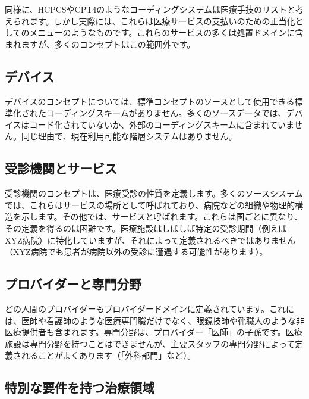 \documentclass[
  11pt]{book}
\theoremstyle{definition}
\theoremstyle{definition}
\theoremstyle{definition}
\theoremstyle{definition}
\theoremstyle{remark}
\begin{document}
同様に、HCPCSやCPT4のようなコーディングシステムは医療手技のリストと考えられます。しかし実際には、これらは医療サービスの支払いのための正当化としてのメニューのようなものです。これらのサービスの多くは処置ドメインに含まれますが、多くのコンセプトはこの範囲外です。

\subsection{デバイス}\label{ux30c7ux30d0ux30a4ux30b9}

デバイスのコンセプトについては、標準コンセプトのソースとして使用できる標準化されたコーディングスキームがありません。多くのソースデータでは、デバイスはコード化されていないか、外部のコーディングスキームに含まれていません。同じ理由で、現在利用可能な階層システムはありません。

\subsection{受診機関とサービス}\label{ux53d7ux8a3aux6a5fux95a2ux3068ux30b5ux30fcux30d3ux30b9}

受診機関のコンセプトは、医療受診の性質を定義します。多くのソースシステムでは、これらはサービスの場所として呼ばれており、病院などの組織や物理的構造を示します。その他では、サービスと呼ばれます。これらは国ごとに異なり、その定義を得るのは困難です。医療施設はしばしば特定の受診期間（例えばXYZ病院）に特化していますが、それによって定義されるべきではありません（XYZ病院でも患者が病院以外の受診に遭遇する可能性があります）。

\subsection{プロバイダーと専門分野}\label{ux30d7ux30edux30d0ux30a4ux30c0ux30fcux3068ux5c02ux9580ux5206ux91ce}

どの人間のプロバイダーもプロバイダードメインに定義されています。これには、医師や看護師のような医療専門職だけでなく、眼鏡技師や靴職人のような非医療提供者も含まれます。専門分野は、プロバイダー「医師」の子孫です。医療施設は専門分野を持つことはできませんが、主要スタッフの専門分野によって定義されることがよくあります（「外科部門」など）。

\subsection{特別な要件を持つ治療領域}\label{ux7279ux5225ux306aux8981ux4ef6ux3092ux6301ux3064ux6cbbux7642ux9818ux57df}
\end{document}
